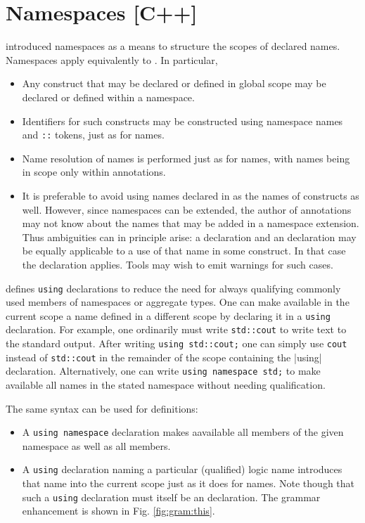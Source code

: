 \section{Namespaces [C++]}
\label{sec:namespaces}

\lang introduced namespaces as a means to structure the scopes of declared names. Namespaces apply equivalently to \NAME. In particular,
\begin{itemize}
\item Any \NAME construct that may be declared or defined 
in global scope may be declared or defined within a namespace.
\item Identifiers for such constructs may be constructed using namespace names and \lstinline|::| tokens, just as for \lang names.
\item Name resolution of \NAME names is performed just as for \lang names, with \NAME names being in scope only within \NAME annotations.
\item It is preferable to avoid using names declared in \lang as the names of \NAME constructs as well. However, since namespaces can be extended, the author of \NAME annotations may not know about the \lang names that may be added in a namespace extension. Thus ambiguities can in
principle arise: a \lang declaration and an \NAME
declaration may be equally applicable to a use of that name 
in some \NAME construct. In that case the \NAME declaration applies.
Tools may wish to emit warnings for such cases.

\end{itemize}

\lang defines \lstinline|using| declarations to reduce the need for always qualifying commonly used members of namespaces or aggregate types.
One can make available in the current scope a name defined in a different scope by declaring it in a \lstinline|using| declaration. For example,
one ordinarily must write \lstinline|std::cout| to write text to the standard output. After writing \lstinline|using std::cout;| one can simply use \lstinline|cout| instead of \lstinline|std::cout| in the remainder of the scope containing the \stinline|using| declaration.
Alternatively, one can write \lstinline|using namespace std;| to make available all names in the stated namespace without needing qualification.

The same syntax can be used for \NAME definitions:
\begin{itemize}
	\item A \lang \lstinline|using namespace| declaration makes aavailable all \NAME members of the given namespace as well as all \lang members.
	\item A \lstinline|using| declaration naming a particular (qualified) logic name introduces that name into the current scope just as it does for \lang names. Note though that such a \lstinline|using| declaration must itself be an \NAME declaration. The grammar enhancement is shown in Fig. \ref{fig:gram:this}.
\end{itemize}


